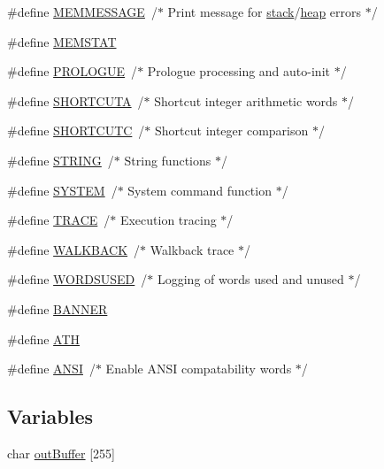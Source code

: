 \begin{DoxyCompactItemize}
\#define \hyperlink{termux-atlcfig_8h_a3a12ced9ae9a894dbc0a31282e769d63}{M\+E\+M\+M\+E\+S\+S\+A\+GE}~/$\ast$ Print message for \hyperlink{FreeRTOS_2atlast_8c_a119bff668c1f986f35cdc8a167c756bb}{stack}/\hyperlink{FreeRTOS_2atlast_8c_a631c4c438b300c6392fe526a50a041c3}{heap} errors $\ast$/
\item 
\#define \hyperlink{termux-atlcfig_8h_a90dbf4dc4f15c07ffcf27e0b757187a7}{M\+E\+M\+S\+T\+AT}
\item 
\#define \hyperlink{termux-atlcfig_8h_a59f8a4119207355f67b920d35ec6cc8e}{P\+R\+O\+L\+O\+G\+UE}~/$\ast$ Prologue processing and auto-\/init $\ast$/
\item 
\#define \hyperlink{termux-atlcfig_8h_ae957ba08823687327a6f74f8ba99cf01}{S\+H\+O\+R\+T\+C\+U\+TA}~/$\ast$ Shortcut integer arithmetic words $\ast$/
\item 
\#define \hyperlink{termux-atlcfig_8h_a7fb6c8bc5e9315d6ad8ecc8f29d22a9a}{S\+H\+O\+R\+T\+C\+U\+TC}~/$\ast$ Shortcut integer comparison $\ast$/
\item 
\#define \hyperlink{termux-atlcfig_8h_a0f4d394a3ab4e09bff60f714c66dc5ee}{S\+T\+R\+I\+NG}~/$\ast$ String functions $\ast$/
\item 
\#define \hyperlink{termux-atlcfig_8h_a21b97df85e65556468b28a576311271c}{S\+Y\+S\+T\+EM}~/$\ast$ System command function $\ast$/
\item 
\#define \hyperlink{termux-atlcfig_8h_aad9cc64d45a76ba0d37c00f8cd9caa37}{T\+R\+A\+CE}~/$\ast$ Execution tracing $\ast$/
\item 
\#define \hyperlink{termux-atlcfig_8h_a8a545fc997e24de1bdccb3454442ddee}{W\+A\+L\+K\+B\+A\+CK}~/$\ast$ Walkback trace $\ast$/
\item 
\#define \hyperlink{termux-atlcfig_8h_a1832f63df1cc6543af5e3de731b77dac}{W\+O\+R\+D\+S\+U\+S\+ED}~/$\ast$ Logging of words used and unused $\ast$/
\item 
\#define \hyperlink{termux-atlcfig_8h_a46c1fb0f4185dc45eda625530bc0fd73}{B\+A\+N\+N\+ER}
\item 
\#define \hyperlink{termux-atlcfig_8h_a55fc4596d1f1291f82c8574e9e4a8369}{A\+TH}
\item 
\#define \hyperlink{termux-atlcfig_8h_a9382b15380bf4f6adaafd94f1c78991a}{A\+N\+SI}~/$\ast$ Enable A\+N\+SI compatability words $\ast$/
\end{DoxyCompactItemize}
\subsection*{Variables}
\begin{DoxyCompactItemize}
\item 
char \hyperlink{termux-atlcfig_8h_a2f25dee1596892b07e30dd78f5ebe81b}{out\+Buffer} \mbox{[}255\mbox{]}
\end{DoxyCompactItemize}



